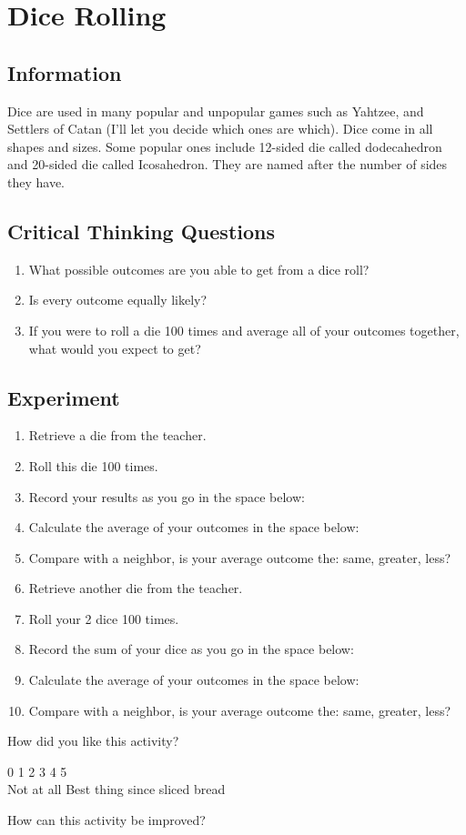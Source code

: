 \documentclass[11pt]{article}
\begin{document}
\section*{Dice Rolling}
\subsection*{Information}
Dice are used in many popular and unpopular games such as Yahtzee, and Settlers of Catan (I'll let you decide which ones are which).  Dice come in all shapes and sizes.  Some popular ones include 12-sided die called dodecahedron and 20-sided die called Icosahedron.  They are named after the number of sides they have. 

\subsection*{Critical Thinking Questions}
\begin{enumerate}
\item What possible outcomes are you able to get from a dice roll?
\item Is every outcome equally likely?
\item If you were to roll a die 100 times and average all of your outcomes together, what would you expect to get?
\end{enumerate}

\subsection*{Experiment}
\begin{enumerate}
\item Retrieve a die from the teacher.
\item Roll this die 100 times.
\item Record your results as you go in the space below:
\vspace{2in}
\item Calculate the average of your outcomes in the space below: 
\vspace{2in}
\item Compare with a neighbor, is your average outcome the: same, greater, less?
\item Retrieve another die from the teacher.
\item Roll your 2 dice 100 times.
\item Record the sum of your dice as you go in the space below:
\vspace{2in}
\item Calculate the average of your outcomes in the space below: 
\vspace{2in}
\item Compare with a neighbor, is your average outcome the: same, greater, less?
\end{enumerate}
\vspace{1.5in}
How did you like this activity?
\par
0 \hfill 1 \hfill 2 \hfill 3 \hfill 4 \hfill 5\\
Not at all \hfill Best thing since sliced bread
\par
How can this activity be improved?
\end{document}
